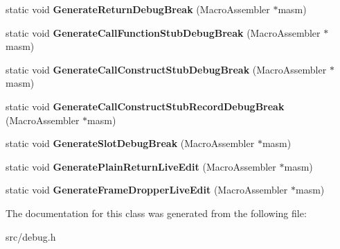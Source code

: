 \begin{DoxyCompactItemize}
\item 
\hypertarget{classv8_1_1internal_1_1_debug_codegen_af0aa8077cc1d14ff28585d992521f821}{}static void {\bfseries Generate\+Return\+Debug\+Break} (Macro\+Assembler $\ast$masm)\label{classv8_1_1internal_1_1_debug_codegen_af0aa8077cc1d14ff28585d992521f821}

\item 
\hypertarget{classv8_1_1internal_1_1_debug_codegen_a627b253e405ec045b3c6303ad61ecae6}{}static void {\bfseries Generate\+Call\+Function\+Stub\+Debug\+Break} (Macro\+Assembler $\ast$masm)\label{classv8_1_1internal_1_1_debug_codegen_a627b253e405ec045b3c6303ad61ecae6}

\item 
\hypertarget{classv8_1_1internal_1_1_debug_codegen_a5dc486166948b9305d092051148c6f28}{}static void {\bfseries Generate\+Call\+Construct\+Stub\+Debug\+Break} (Macro\+Assembler $\ast$masm)\label{classv8_1_1internal_1_1_debug_codegen_a5dc486166948b9305d092051148c6f28}

\item 
\hypertarget{classv8_1_1internal_1_1_debug_codegen_a606cc42a526f2c0989de8109edcad7a6}{}static void {\bfseries Generate\+Call\+Construct\+Stub\+Record\+Debug\+Break} (Macro\+Assembler $\ast$masm)\label{classv8_1_1internal_1_1_debug_codegen_a606cc42a526f2c0989de8109edcad7a6}

\item 
\hypertarget{classv8_1_1internal_1_1_debug_codegen_afa995f884a51b11ce975ab0e962eb6a8}{}static void {\bfseries Generate\+Slot\+Debug\+Break} (Macro\+Assembler $\ast$masm)\label{classv8_1_1internal_1_1_debug_codegen_afa995f884a51b11ce975ab0e962eb6a8}

\item 
\hypertarget{classv8_1_1internal_1_1_debug_codegen_a541ec9db52b3241de2e0df58ebc9a6c4}{}static void {\bfseries Generate\+Plain\+Return\+Live\+Edit} (Macro\+Assembler $\ast$masm)\label{classv8_1_1internal_1_1_debug_codegen_a541ec9db52b3241de2e0df58ebc9a6c4}

\item 
\hypertarget{classv8_1_1internal_1_1_debug_codegen_ac1cc4eccb6ae5d0a62f953cbee1e4d06}{}static void {\bfseries Generate\+Frame\+Dropper\+Live\+Edit} (Macro\+Assembler $\ast$masm)\label{classv8_1_1internal_1_1_debug_codegen_ac1cc4eccb6ae5d0a62f953cbee1e4d06}

\end{DoxyCompactItemize}


The documentation for this class was generated from the following file\+:\begin{DoxyCompactItemize}
\item 
src/debug.\+h\end{DoxyCompactItemize}
